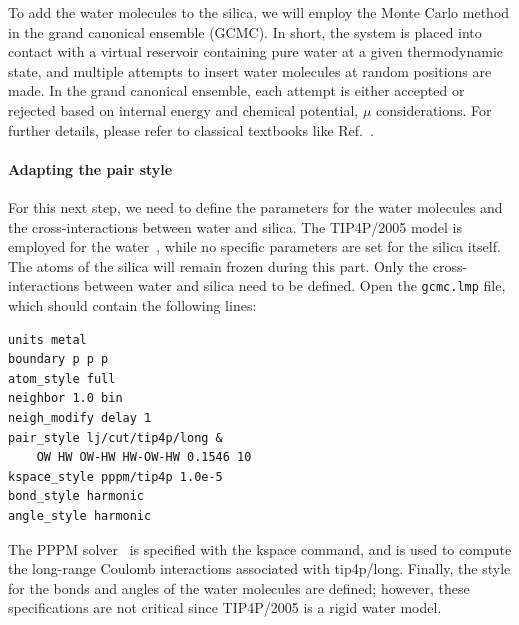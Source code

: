 \documentclass[9pt,tutorial]{livecoms}
\newcommand{\lmpcmd}[1]{\colorbox{listing}{\textcolor{command}{\small{#1}}}} %
\newcommand{\flecmd}[1]{\textcolor{command}{\texttt{#1}}} %
\begin{document}
To add the water molecules to the silica, we will employ the Monte Carlo
method in the grand canonical ensemble (GCMC).  In short, the system is
placed into contact with a virtual reservoir {\color{blue} containing pure 
water at a given thermodynamic state}, and multiple attempts to insert 
water molecules at random positions are made.  {\color{blue} In the grand 
canonical ensemble, each} attempt is either accepted or rejected based on 
{\color{blue} internal} energy {\color{blue} and chemical potential, $\mu$} 
considerations.  For further details, please refer to
classical textbooks like Ref.~. 


{\color{blue}
\paragraph{Adapting the pair style}

For this next step, we need to define the parameters for the water molecules and
the cross-interactions between water and silica. The TIP4P/2005 model is employed
for the water~\cite{abascal2005general}, while no specific parameters are set
for the silica itself. The atoms of the silica will remain frozen during this part.
Only the cross-interactions between water and silica need
to be defined. Open the \flecmd{gcmc.lmp} file, which should contain the following lines:
\begin{lstlisting}
units metal
boundary p p p
atom_style full
neighbor 1.0 bin
neigh_modify delay 1
pair_style lj/cut/tip4p/long &
    OW HW OW-HW HW-OW-HW 0.1546 10
kspace_style pppm/tip4p 1.0e-5
bond_style harmonic
angle_style harmonic
\end{lstlisting}
The PPPM solver~\cite{luty1996calculating} is specified with the \lmpcmd{kspace}
command, and is used to compute the long-range Coulomb interactions associated
with \lmpcmd{tip4p/long}.  Finally, the style for the bonds
and angles of the water molecules are defined; however, these specifications are
not critical since TIP4P/2005 is a rigid water model.}
\end{document}
